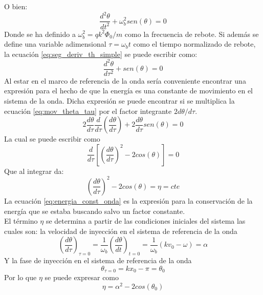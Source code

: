 O bien:
\begin{equation}
\label{eq:seg_deriv_th_simple}
\frac{d^2\theta}{dt^2}+\omega_b^2 sen(\theta)=0
\end{equation}
Donde se ha definido a $\omega_b^2 = qk^2\Phi_0/m$ como la frecuencia de rebote. Si además se define una variable adimensional $\tau = \omega_b t$ como el tiempo normalizado de rebote, la ecuación \ref{eq:seg_deriv_th_simple} se puede escribir como:
\begin{equation}
\label{eq:mov_theta_tau}
\frac{d^2\theta}{d\tau^2}+sen(\theta)=0
\end{equation}
Al estar en el marco de referencia de la onda sería conveniente encontrar una expresión para el hecho de que la energía es una constante de movimiento en el sistema de la onda. Dicha expresión se puede encontrar si se multiplica la ecuación \ref{eq:mov_theta_tau} por el factor integrante $2d\theta/d\tau$.
\begin{equation}
2\frac{d\theta}{d\tau}\frac{d}{d\tau}\left(\frac{d\theta}{d\tau}\right) + 2\frac{d\theta}{d\tau}sen(\theta)=0
\end{equation}
La cual se puede escribir como
\begin{equation}
\label{eq:energia_constante_1}
\frac{d}{d\tau}\left[\left(\frac{d\theta}{d\tau}\right)^2 -2cos(\theta)\right]=0
\end{equation}
Que al integrar da:
\begin{equation}
\label{eq:energia_const_onda}
\left(\frac{d\theta}{d\tau}\right)^2 -2cos(\theta)=\eta=cte
\end{equation}
La ecuación \ref{eq:energia_const_onda} es la expresión para la conservación de la energía que se estaba buscando salvo un factor constante.\\
El término $\eta$ se determina a partir de las condiciones iniciales del sistema las cuales son: la velocidad de inyección en el sistema de referencia de la onda
\begin{equation}
\label{eq:wave_frame_injection_velocity}
\left(\frac{d\theta}{d\tau}\right)_{\tau =0}=\frac{1}{\omega_b}\left(\frac{d\theta}{dt}\right)_{t=0}=\frac{1}{\omega_b}(kv_0-\omega)=\alpha
\end{equation}
Y la fase de inyección en el sistema de referencia de la onda
\begin{equation}
\label{eq:wave_frame_injection_phase}
\theta_{\tau=0}=kx_0-\pi=\theta_0
\end{equation}
Por lo que $\eta$ se puede expresar como
\begin{equation}
\label{eq:expresion_eta_wave_frame}
\eta = \alpha^2 -2cos(\theta_0)
\end{equation}
